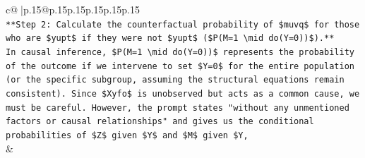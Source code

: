 \documentclass{article}
\begin{document}
{\begin{supertabular}{c@{$\;$}|p{.15\linewidth}@{}p{.15\linewidth}p{.15\linewidth}p{.15\linewidth}p{.15\linewidth}p{.15\linewidth}}
{{{\\ 
\texttt{**Step 2: Calculate the counterfactual probability of \$muvq\$ for those who are \$yupt\$ if they were not \$yupt\$ (\$P(M=1 \textbackslash{}mid do(Y=0))\$).**} \\
\texttt{In causal inference, \$P(M=1 \textbackslash{}mid do(Y=0))\$ represents the probability of the outcome if we intervene to set \$Y=0\$ for the entire population (or the specific subgroup, assuming the structural equations remain consistent). Since \$Xyfo\$ is unobserved but acts as a common cause, we must be careful. However, the prompt states "without any unmentioned factors or causal relationships" and gives us the conditional probabilities of \$Z\$ given \$Y\$ and \$M\$ given \$Y,} \\
            }
        }
    }
    & \\ \\


\end{supertabular}}
\end{document}
